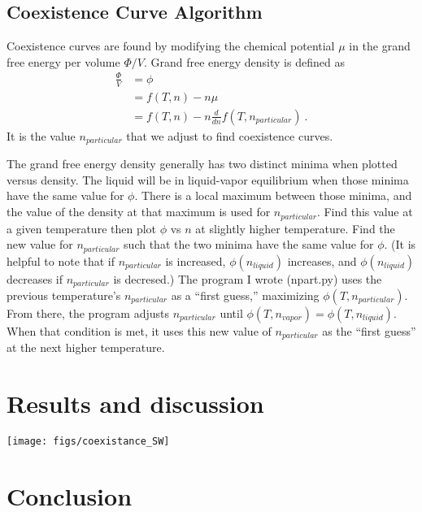 \documentclass[letterpaper,twocolumn,amsmath,amssymb,prb]{revtex4-1}
\newcommand{\npart}{n_{particular}}
\newcommand{\nliq}{n_{liquid}}
\newcommand{\nvap}{n_{vapor}}
\begin{document}
\subsection{Coexistence Curve Algorithm}
Coexistence curves are found by modifying the chemical potential $\mu$
in the grand free energy per volume $\Phi/V$. Grand free energy
density is defined as
\begin{align}
  \frac{\Phi}{V} &= \phi \nonumber \\
                 &= f(T,n) - n\mu \nonumber \\
                 &= f(T,n) - n\frac{d}{dn}f(T,\npart)\ .
\end{align}
It is the value $\npart$ that we adjust to find coexistence curves.

The grand free energy density generally has two distinct minima when
plotted versus density. The liquid will be in liquid-vapor equilibrium
when those minima have the same value for $\phi$. There is a local
maximum between those minima, and the value of the density at that
maximum is used for $\npart$. Find this value at a given temperature
then plot $\phi$ vs $n$ at slightly higher temperature. Find the new
value for $\npart$ such that the two minima have the same value for
$\phi$. (It is helpful to note that if $\npart$ is increased,
$\phi(\nliq)$ increases, and $\phi(\nliq)$ decreases if $\npart$ is
decresed.) The program I wrote (npart.py) uses the previous
temperature's $\npart$ as a ``first guess,'' maximizing
$\phi(T,\npart)$. From there, the program adjusts $\npart$
until $\phi(T,\nvap) = \phi(T,\nliq)$. When that condition is met, it
uses this new value of $\npart$ as the ``first guess'' at the next
higher temperature.

\section{Results and discussion}

\texttt{[image: figs/coexistance\_SW]}



\section{Conclusion}


\end{document}
